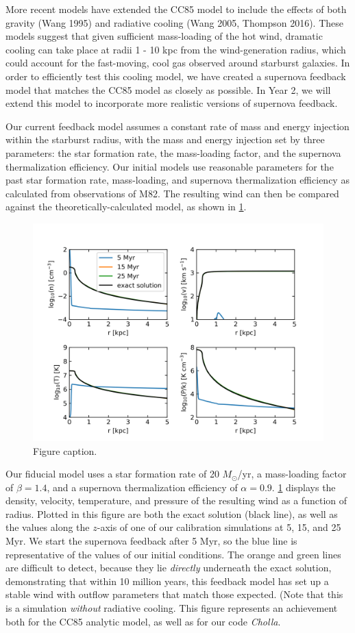 \documentclass[11pt,letterpaper,english]{article}
\begin{document}
More recent models have extended the CC85 model to include the effects of both gravity (Wang 1995) and radiative cooling (Wang 2005, Thompson 2016). These models suggest that given sufficient mass-loading of the hot wind, dramatic cooling can take place at radii 1 - 10 kpc from the wind-generation radius, which could account for the fast-moving, cool gas observed around starburst galaxies. In order to efficiently test this cooling model, we have created a supernova feedback model that matches the CC85 model as closely as possible. In Year 2, we will extend this model to incorporate more realistic versions of supernova feedback.

Our current feedback model assumes a constant rate of mass and energy injection within the starburst radius, with the mass and energy injection set by three parameters: the star formation rate, the mass-loading factor, and the supernova thermalization efficiency. Our initial models use reasonable parameters for the past star formation rate, mass-loading, and supernova thermalization efficiency as calculated from observations of M82. The resulting wind can then be compared against the theoretically-calculated model, as shown in \ref{fig:CC85}.

\begin{figure}[h]
\centering
\includegraphics[width=0.8\linewidth]{CC85.png}
\caption{Figure caption.}
\label{fig:CC85}
\end{figure}

Our fiducial model uses a star formation rate of 20 $M_\odot$/yr, a mass-loading factor of $\beta = 1.4$, and a supernova thermalization efficiency of $\alpha = 0.9$. \ref{fig:CC85} displays the density, velocity, temperature, and pressure of the resulting wind as a function of radius. Plotted in this figure are both the exact solution (black line), as well as the values along the $z$-axis of one of our calibration simulations at 5, 15, and 25 Myr. We start the supernova feedback after 5 Myr, so the blue line is representative of the values of our initial conditions. The orange and green lines are difficult to detect, because they lie \textit{directly} underneath the exact solution, demonstrating that within 10 million years, this feedback model has set up a stable wind with outflow parameters that match those expected. (Note that this is a simulation \textit{without} radiative cooling. This figure represents an achievement both for the CC85 analytic model, as well as for our code \textit{Cholla}.
\end{document}
